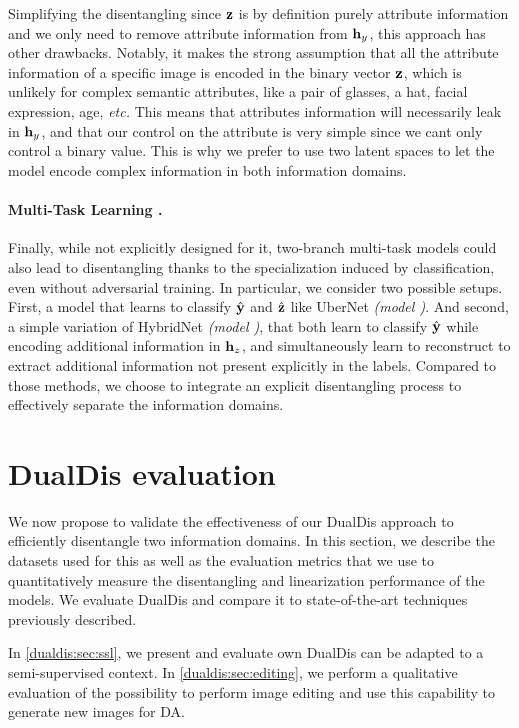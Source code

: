 Simplifying the disentangling since $\mathbf{z}$ is by definition purely attribute information and we only need to remove attribute information from $\mathbf{h}_y$, this approach has other drawbacks. Notably, it makes the strong assumption that all the attribute information of a specific image is encoded in the binary vector $\mathbf{z}$, which is unlikely for complex semantic attributes, like a pair of glasses, a hat, facial expression, age, \textit{etc.} This means that attributes information will necessarily leak in $\mathbf{h}_y$, and that our control on the attribute is very simple since we cant only control a binary value. This is why we prefer to use two latent spaces to let the model encode complex information in both information domains.

\paragraph{Multi-Task Learning \MTHNref.} Finally, while not explicitly designed for it, two-branch multi-task models could also lead to disentangling thanks to the specialization induced by classification, even without adversarial training. In particular, we consider two possible setups. First, a model that learns to classify $\hat{\mathbf{y}}$ and $\hat{\mathbf{z}}$ like UberNet \citep{kokkinos2017} \textit{(model \MTref)}. And second, a simple variation of HybridNet \textit{(model \HNref)}, that both learn to classify $\hat{\mathbf{y}}$ while encoding additional information in $\mathbf{h}_z$, and simultaneously learn to reconstruct to extract additional information not present explicitly in the labels.
Compared to those methods, we choose to integrate an explicit disentangling process to effectively separate the information domains.

\FloatBarrier

\section{DualDis evaluation}
\label{dualdis:sec:exp}

We now propose to validate the effectiveness of our DualDis approach to efficiently disentangle two information domains. In this section, we describe the datasets used for this as well as the evaluation metrics that we use to quantitatively measure the disentangling and linearization performance of the models. We evaluate DualDis and compare it to state-of-the-art techniques previously described.

In \autoref{dualdis:sec:ssl}, we present and evaluate own DualDis can be adapted to a semi-supervised context. In \autoref{dualdis:sec:editing}, we perform a qualitative evaluation of the possibility to perform image editing and use this capability to generate new images for \acf{DA}.

